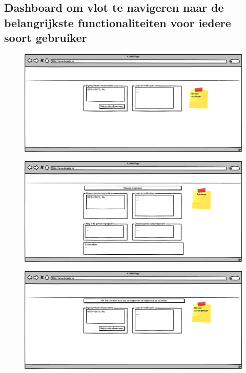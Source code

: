 \documentclass[11pt,a4paper,oneside]{article}
\begin{document}
\subsection{Dashboard om vlot te navigeren naar de belangrijkste functionaliteiten voor iedere soort gebruiker}
\begin{figure}[H]\includegraphics[width=\textwidth]{../../mockups/dashboard_newcaruser.png}\end{figure}
\begin{figure}[H]\includegraphics[width=\textwidth]{../../mockups/dashboard_caruser.png}\end{figure}
\begin{figure}[H]\includegraphics[width=\textwidth]{../../mockups/dashboard_newcarowner.png}\end{figure}
\end{document}
